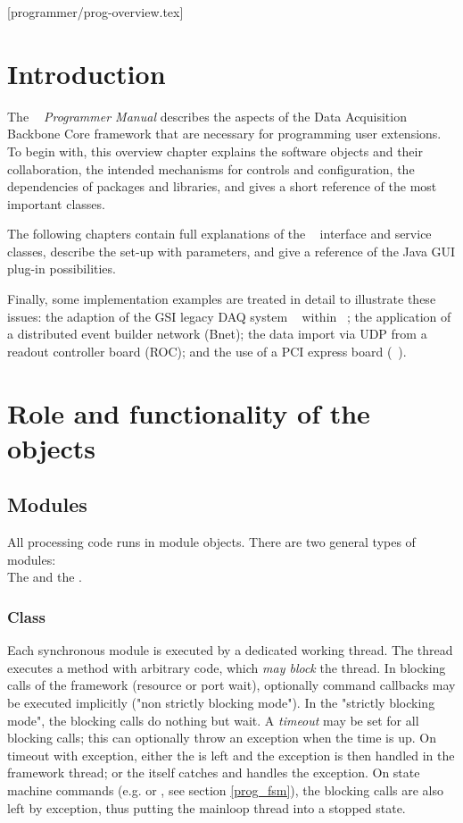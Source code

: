 [programmer/prog-overview.tex]
\section{Introduction}
The {\em \dabc~ Programmer Manual} 
describes the aspects of the Data Acquisition Backbone Core
framework that are necessary for programming user extensions.
To begin with, this overview chapter explains the
software objects and their collaboration, 
the intended mechanisms for controls and configuration, the dependencies of
packages and libraries, and gives a short reference of the most important classes.

The following chapters contain full explanations of the \dabc~ interface 
and service classes, 
describe the set-up with parameters, and give a reference of the Java GUI plug-in possibilities.

Finally, some implementation examples are treated in detail to illustrate these issues:
the adaption of the GSI legacy DAQ system \mbs~ within  \dabc~; the application of a distributed
event builder network (Bnet); the data import via UDP from a readout controller board (ROC);
and the use of a PCI express board (\ABB~).

\section{Role and  functionality of the objects}

\subsection{Modules}
\label{prog_overview_modules}
All processing code runs in module objects. 
There are two general types of modules: \\
The  and the . 

\subsubsection{Class } 
Each synchronous module is executed by a 
dedicated working thread. The thread executes a
 method  with arbitrary code, which {\sl may block} 
the thread. In blocking calls of the framework (resource or 
port wait), optionally command callbacks may be executed 
implicitly ("non strictly blocking mode"). In the "strictly 
blocking mode", the blocking calls do nothing but wait. 
A {\sl timeout} may be set for all blocking calls; this can 
optionally throw an exception when the time is up. On timeout 
with exception, either the  is left and the exception 
is then handled in the framework thread; or the  itself 
catches and handles the exception. On state machine commands (e.g. 
 or , see section \ref{prog_fsm}), 
the blocking calls are also left by exception, 
thus putting the mainloop thread into a stopped state.

